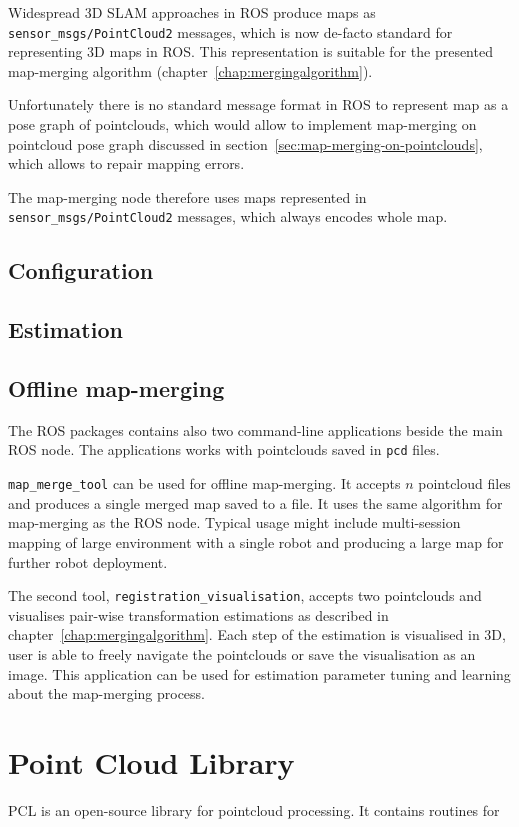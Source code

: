 Widespread \gls{3D} \gls{SLAM} approaches in \gls{ROS} produce maps as \texttt{sensor\_msgs/PointCloud2} messages, which is now de-facto standard for representing \gls{3D} maps in \gls{ROS}. This representation is suitable for the presented map-merging algorithm (chapter~\ref{chap:mergingalgorithm}).

Unfortunately there is no standard message format in \gls{ROS} to represent map as a pose graph of pointclouds, which would allow to implement map-merging on pointcloud pose graph discussed in section~\ref{sec:map-merging-on-pointclouds}, which allows to repair mapping errors.

The map-merging node therefore uses maps represented in \texttt{sensor\_msgs/PointCloud2} messages, which always encodes whole map.


\subsection{Configuration}


\subsection{Estimation}


\subsection{Offline map-merging}

The \gls{ROS} packages contains also two command-line applications beside the main \gls{ROS} node. The applications works with pointclouds saved in \texttt{pcd} files.

\texttt{map\_merge\_tool} can be used for offline map-merging. It accepts $n$ pointcloud files and produces a single merged map saved to a file. It uses the same algorithm for map-merging as the \gls{ROS} node. Typical usage might include multi-session mapping of large environment with a single robot and producing a large map for further robot deployment.

The second tool, \texttt{registration\_visualisation}, accepts two pointclouds and visualises pair-wise transformation estimations as described in chapter~\ref{chap:mergingalgorithm}. Each step of the estimation is visualised in \gls{3D}, user is able to freely navigate the pointclouds or save the visualisation as an image. This application can be used for estimation parameter tuning and learning about the map-merging process.


\section{Point Cloud Library}
\label{sec:pcl}

\gls{PCL} is an open-source library for pointcloud processing. It contains routines for